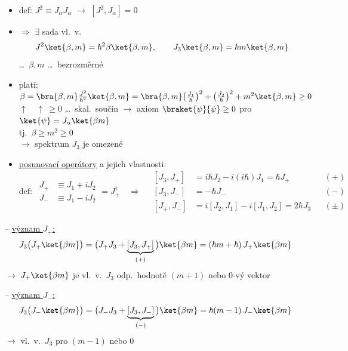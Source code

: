 \begin{itemize}
  \item def: \quad $J^2 \equiv J_\alpha J_\alpha$ \quad $\to$ \quad $[J^2,J_\alpha] = 0$
  \item $\Rightarrow$ $\exists$ sada vl.\ v.
  \[
    J^2\ket{\beta,m} = \hbar^2\beta\ket{\beta,m}, \qquad J_3\ket{\beta,m} = \hbar m\ket{\beta,m}
  \]
  \dots\ $\beta, m$ \dots\ bezrozměrné \quad {}
  \item platí: \quad
  $\beta = \bra{\beta,m}\frac{J^2}{\hbar^2}\ket{\beta,m} = \bra{\beta,m}\big(\tfrac{J_1}{\hbar}\big)^2 + \big(\tfrac{J_2}{\hbar}\big)^2 + m^2\ket{\beta,m} \geq 0$ \\
  \hspace*{6cm} $\uparrow\quad\uparrow\ \geq 0$ \dots\ skal.\ součin $\to$ axiom $\braket{\psi}{\psi}\geq 0$ pro $\ket{\psi} = J_\alpha\ket{\beta m}$ \\
  tj.\ \quad $\beta \geq m^2 \geq 0$ \\
  \quad $\to$ spektrum $J_3$ je omezené
  \item \underline{posunovací operátory} a jejich vlastnosti:
  \[
    \text{def:}\ \ \boxed{\begin{aligned} J_+ &\equiv J_1 + iJ_2 \\ J_- &\equiv J_1 - iJ_2 \end{aligned}} = J_+^\dagger
    \quad\Rightarrow\quad
    \begin{aligned}
      {}[J_3,J_+] &= i\hbar J_2 - i(i\hbar)J_1 = \hbar J_+ &&(+)\\
      [J_3,J_-] &= -\hbar J_- &&(-)\\
      [J_+,J_-] &= i[J_2,J_1] - i[J_1,J_2] = 2\hbar J_3 &&(\pm)
    \end{aligned}
  \]
\end{itemize}

-- \underline{význam $J_+$:}
\[
  J_3\big(J_+\ket{\beta m}\big) = \big(J_+J_3 + \underbrace{[J_3,J_+]}_{(+)}\big)\ket{\beta m} = (\hbar m + \hbar)\,J_+\ket{\beta m}
\]
\quad $\to$ $J_+\ket{\beta m}$ je vl.\ v.\ $J_3$ odp.\ hodnotě $(m+1)$ nebo $0$-vý vektor


-- \underline{význam $J_-$:}
\[
  J_3\big(J_-\ket{\beta m}\big) = \big(J_-J_3 + \underbrace{[J_3,J_-]}_{(-)}\big)\ket{\beta m} = \hbar(m-1)\,J_-\ket{\beta m}
\]
\quad $\to$ vl.\ v.\ $J_3$ pro $(m-1)$ nebo $0$

